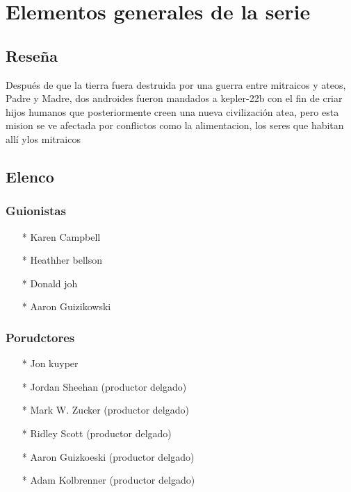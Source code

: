 \documentclass[ä5paper, 11pt]{article}
\author{Ivan Borjas }
\date{22 de septiemre de 2022}
\begin{document}
\pagestyle{fancy}
\pagecolor{blue}
\rhead{\thepage}
\lhead{\lefttmark}
   \centering{\textbf{\huge \textcolor{red}{Rysed by Wolves}}}
   \section*{Elementos generales de la serie}
        \subsection*{Reseña}
     {Después de que la tierra fuera destruida por una guerra entre mitraicos y ateos, Padre y Madre, dos androides fueron mandados a kepler-22b con el fin de criar hijos humanos que posteriormente creen una nueva civilización atea, pero esta mision se ve afectada por conflictos como la alimentacion, los seres que habitan allí ylos mitraicos}
        \subsection*{Elenco}  
          \subsubsection*{Guionistas}
              \begin{enumerate}
              \item [*] {Karen Campbell}
              \item [*]{Heathher bellson}
              \item[*]{Donald joh}
              \item[*]{Aaron Guizikowski}
           \end{enumerate}
          \subsubsection*{Porudctores}
            \begin{enumerate}
                \item[*]{Jon kuyper}
                \item[*]{Jordan Sheehan (productor delgado)}
                \item[*]{ Mark W. Zucker (productor delgado)}
                \item[*]{Ridley Scott (productor delgado)}
                \item[*]{Aaron Guizkoeski (productor delgado)}
                \item[*]{Adam Kolbrenner (productor delgado)}
            \end{enumerate}
\end{document}
